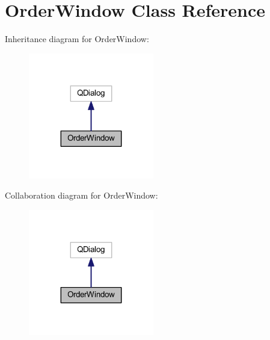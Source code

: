 \hypertarget{class_order_window}{}\section{Order\+Window Class Reference}
\label{class_order_window}


Inheritance diagram for Order\+Window\+:\nopagebreak
\begin{figure}[H]
\begin{center}
\leavevmode
\includegraphics[width=155pt]{class_order_window__inherit__graph}
\end{center}
\end{figure}


Collaboration diagram for Order\+Window\+:\nopagebreak
\begin{figure}[H]
\begin{center}
\leavevmode
\includegraphics[width=155pt]{class_order_window__coll__graph}
\end{center}
\end{figure}
